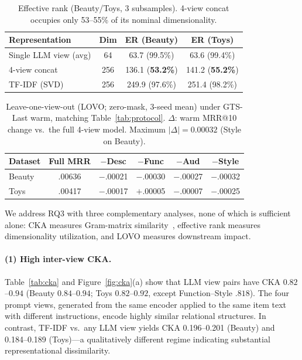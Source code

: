 \documentclass[sigconf,natbib=true,anonymous]{acmart}
\begin{document}
\begin{table}[t]
\centering
\caption{%
Effective rank (Beauty/Toys, 3 subsamples).
4-view concat occupies only 53--55\% of its nominal dimensionality.%
}
\label{tab:effrank}
\small
\begin{tabular}{@{}lccc@{}}
\toprule
Representation & Dim & ER (Beauty) & ER (Toys) \\
\midrule
Single LLM view (avg) & 64 & 63.7 (99.5\%) & 63.6 (99.4\%) \\
4-view concat & 256 & 136.1 (\textbf{53.2\%}) & 141.2 (\textbf{55.2\%}) \\
TF-IDF (SVD) & 256 & 249.9 (97.6\%) & 251.4 (98.2\%) \\
\bottomrule
\end{tabular}
\end{table}

\begin{table}[t]
\centering
\caption{%
Leave-one-view-out (LOVO; zero-mask, 3-seed mean) under GTS-Last warm, matching Table~\ref{tab:protocol}.
$\Delta$: warm MRR@10 change vs.\ the full 4-view model.
Maximum $|\Delta|{=}0.00032$ (Style on Beauty).%
}
\label{tab:lovo}
\small
\setlength{\tabcolsep}{3.5pt}
\begin{tabular}{@{}lccccc@{}}
\toprule
Dataset & Full MRR & $-$Desc & $-$Func & $-$Aud & $-$Style \\
\midrule
Beauty & .00636 & $-$.00021 & $-$.00030 & $-$.00027 & $-$.00032 \\
Toys   & .00417 & $-$.00017 & $+$.00005 & $-$.00007 & $-$.00025 \\
\bottomrule
\end{tabular}
\end{table}

We address RQ3 with three complementary analyses, none of which is sufficient alone: CKA measures Gram-matrix similarity~\cite{kornblith2019cka}, effective rank measures dimensionality utilization, and LOVO measures downstream impact.

\paragraph{(1) High inter-view CKA.}
Table~\ref{tab:cka} and Figure~\ref{fig:cka}(a) show that LLM view pairs have CKA $0.82$--$0.94$ (Beauty $0.84$--$0.94$; Toys $0.82$--$0.92$, except Function--Style $.818$).
The four prompt views, generated from the same encoder applied to the same item text with different instructions, encode highly similar relational structures.
In contrast, TF-IDF vs.\ any LLM view yields CKA 0.196--0.201 (Beauty) and 0.184--0.189 (Toys)---a qualitatively different regime indicating substantial representational dissimilarity.
\end{document}
